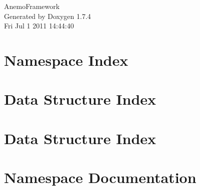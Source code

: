 \documentclass[a4paper]{book}
\begin{document}
\hypersetup{pageanchor=false}
\begin{titlepage}
\vspace*{7cm}
\begin{center}
{\Large AnemoFramework }\\
\vspace*{1cm}
{\large Generated by Doxygen 1.7.4}\\
\vspace*{0.5cm}
{\small Fri Jul 1 2011 14:44:40}\\
\end{center}
\end{titlepage}
\clearemptydoublepage
{}
\tableofcontents
\clearemptydoublepage
{}
\hypersetup{pageanchor=true}
\chapter{Namespace Index}

\chapter{Data Structure Index}

\chapter{Data Structure Index}

\chapter{Namespace Documentation}































\end{document}
